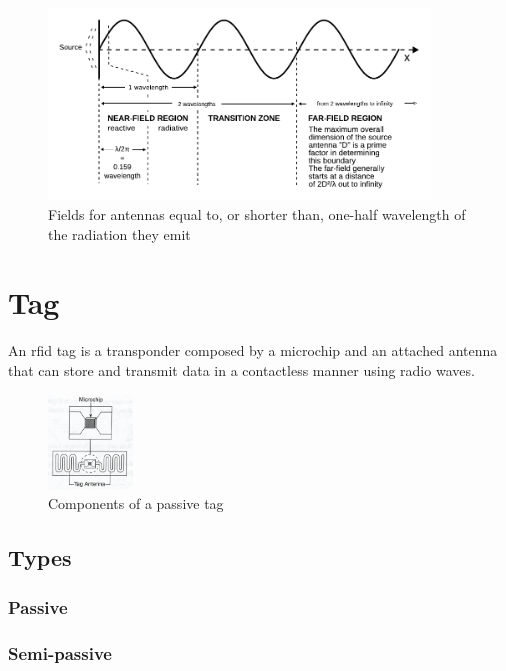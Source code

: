 \begin{figure}[!ht]
    \centering
    \includegraphics[width=0.9\textwidth]{./figs/02-state-of-the-art/Field_regions_for_typical_antennas_vector.pdf}
    \caption{Fields for antennas equal to, or shorter than, one-half wavelength of the radiation they emit~\cite{SafetyHealthTopics}} 
    \label{fig:fieldregionsshortantenna}
\end{figure}

\section{Tag}

An \ac{rfid} tag is a transponder composed by a microchip and an attached antenna that can store and transmit data in a contactless manner using radio waves.

\begin{figure}[!ht]
    \centering
    \includegraphics[width=0.2\textwidth]{./figs/02-state-of-the-art/tag.jpg}
    \caption{Components of a passive tag~\cite{lahiriRFIDSourcebook2005}} 
    \label{fig:passivetag}
\end{figure}

\subsection{Types}
\subsubsection{Passive}
\subsubsection{Semi-passive}
